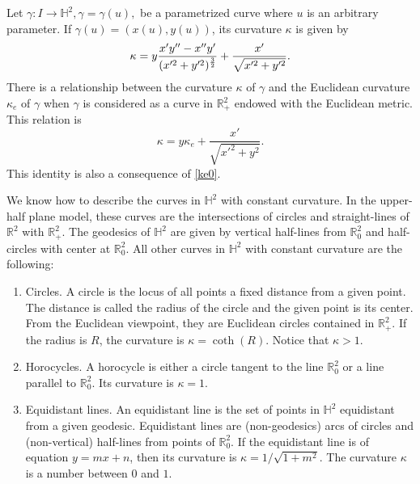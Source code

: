 \documentclass[12pt]{amsart}
\theoremstyle{plain}
\theoremstyle{definition}
\def\h{\mathbb H}
\def\r{\mathbb R}
\begin{document}
Let $\gamma\colon I \rightarrow \h^2, \gamma = \gamma(u),$ be a parametrized curve where $u$ is an arbitrary parameter. If $\gamma(u) = (x(u), y(u))$,  its   curvature  $\kappa$  is given by 
\begin{equation}\label{ke0}
\kappa =  y\frac{x'y'' - x''y'}{(x'^2 + y'^2)^{3 \over 2}}+\frac{x'}{\sqrt{x'^2+y'^2}}.
\end{equation}
There is a relationship between the curvature $\kappa$ of $\gamma$ and the Euclidean curvature $\kappa_e$ of $\gamma$ when $\gamma$ is considered as a curve in $\r^2_{+}$ endowed with the Euclidean metric. This relation is 
\begin{equation}\label{ke}
\kappa=y\kappa_e+\frac{x'}{\sqrt{x'^2+y^2}}.
\end{equation}
This identity is also a consequence of \eqref{ke0}. 

We know how to describe the curves in $\h^2$ with constant curvature. In the upper-half plane model, these curves are   the intersections of circles and straight-lines of $\r^2$ with $\r^2_+$.  The geodesics of $\h^2$ are given by vertical half-lines from $\r^2_0$ and half-circles with center at $\r^2_0$. All other curves in $\h^2$ with constant curvature are the following:
\begin{enumerate}
\item Circles.  A circle   is the locus of all points a fixed distance from a given point. The distance is called the radius of the circle and the given point is its  center.  From the Euclidean viewpoint, they are Euclidean circles contained in $\r^2_+$.  If the radius is $R$, the   curvature is $\kappa =\coth(R)$. Notice that $\kappa>1$.
\item Horocycles. A horocycle is either a circle tangent to the line $\r^2_0$ or a  line parallel to $\r^2_0$.  Its   curvature is $\kappa=1$. 
\item  Equidistant lines. An equidistant line is the set of points in $\h^2$ equidistant from a given geodesic.  Equidistant lines are  (non-geodesics)  arcs of circles and (non-vertical) half-lines from points of $\r^2_0$. If the equidistant line is of equation $y=mx+n$, then its curvature is $\kappa=1/\sqrt{1+m^2}$.  The   curvature $\kappa$ is a number between $0$ and $1$. 
\end{enumerate}
\end{document}
